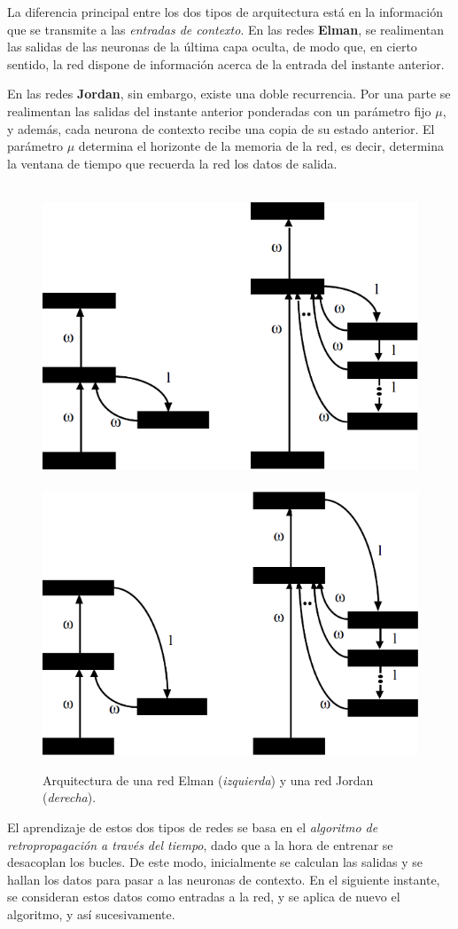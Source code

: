 \documentclass[10pt,a4paper]{article}
\begin{document}
La diferencia principal entre los dos tipos de arquitectura está en la información que se transmite a las \textit{entradas de contexto}. En las redes \textbf{Elman}, se realimentan las salidas de las neuronas de la última capa oculta, de modo que, en cierto sentido, la red dispone de información acerca de la entrada del instante anterior.

En las redes \textbf{Jordan}, sin embargo, existe una doble recurrencia. Por una parte se realimentan las salidas del instante anterior ponderadas con un parámetro fijo $\mu$, y además, cada neurona de contexto recibe una copia de su estado anterior. El parámetro $\mu$ determina el horizonte de la memoria de la red, es decir, determina la ventana de tiempo que recuerda la red los datos de salida.

\begin{figure}[ht!]
  \caption{Arquitectura de una red Elman (\textit{izquierda}) y una red Jordan (\textit{derecha}).}
  \label{fig:elman_jordan2}
  \hbox{
  \includegraphics[width=.40\textwidth-\fboxrule-\fboxrule]{imgs/elman.png}
  \hspace{.13\textwidth-\fboxrule-\fboxrule}
  \includegraphics[width=.40\textwidth-\fboxrule-\fboxrule]{imgs/jordan.png}}
\end{figure}

El aprendizaje de estos dos tipos de redes se basa en el \textit{algoritmo de retropropagación a través del tiempo}, dado que a la hora de entrenar se desacoplan los bucles. De este modo, inicialmente se calculan las salidas y se hallan los datos para pasar a las neuronas de contexto. En el siguiente instante, se consideran estos datos como entradas a la red, y se aplica de nuevo el algoritmo, y así sucesivamente.
\end{document}
